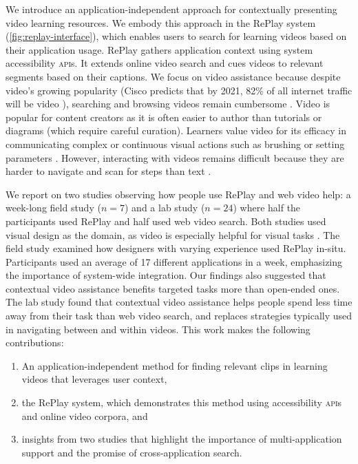 We introduce an application-independent approach for contextually presenting video learning resources. We embody this approach in the RePlay system (\autoref{fig:replay-interface}), which enables users to search for learning videos based on their application usage. RePlay gathers application context using system accessibility \textsc{api}s. It extends online video search and cues videos to relevant segments based on their captions. We focus on video assistance because despite video's growing popularity (Cisco predicts that by 2021, 82\% of all internet traffic will be video \cite{Cisco}), searching and browsing videos remain cumbersome \cite{Kim2014, Pavel2014, Pavel2015}. Video is popular for content creators as it is often easier to author than tutorials or diagrams (which require careful curation). Learners value video for its efficacy in communicating complex or continuous visual actions such as brushing or setting parameters \cite{Chi2012}. However, interacting with videos remains difficult because they are harder to navigate and scan for steps than text \cite{Chi2012}.


We report on two studies observing how people use RePlay and web video help: a week-long field study ($n\!=\!7$) and a lab study ($n\!=\!24$) where half the participants used RePlay and half used web video search. Both studies used visual design as the domain, as video is especially helpful for visual tasks \cite{Pongnumkul2011}. The field study examined how designers with varying experience used RePlay in-situ. Participants used an average of 17 different applications in a week, emphasizing the importance of system-wide integration. Our findings also suggested that contextual video assistance benefits targeted tasks more than open-ended ones. The lab study found that contextual video assistance helps people spend less time away from their task than web video search, and replaces strategies typically used in navigating between and within videos. This work makes the following contributions:

\begin{enumerate}
    \item An application-independent method for finding relevant clips in learning videos that leverages user context,
    \item the RePlay system, which demonstrates this method using accessibility \textsc{api}s and online video corpora, and
    \item insights from two studies that highlight the importance of multi-application support and the promise of cross-application search.
\end{enumerate}




